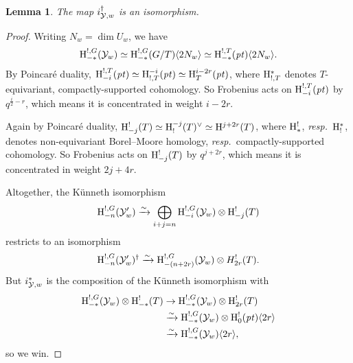 \documentclass[a4paper,10pt,leqno]{amsart}
\theoremstyle{plain}
\theoremstyle{plain}
\theoremstyle{plain}
\newtheorem{lem}[thm]{Lemma}
\theoremstyle{definition}
\theoremstyle{remark}
\newcommand{\point}{\mathit{pt}}
\begin{document}
\begin{lem}
The map $i_{\cal{Y}, w}^\dagger$ is an isomorphism.
\end{lem}

\begin{proof}
Writing $N_w = \dim U_w$, we have
\begin{align}
\ur{H}_{-\ast}^{!, G}(\cal{Y}_w)
\simeq \ur{H}_{-\ast}^{!, G}(G/T)\langle 2N_w\rangle
\simeq \ur{H}_{-\ast}^{!, T}(\point)\langle 2N_w\rangle.
\end{align}
By Poincar\'e duality, $\ur{H}_{-i}^{!, T}(\point) \simeq \ur{H}_{!, T}^{-i}(\point) \simeq \ur{H}_T^{i - 2r}(\point)$, where $\ur{H}_{!, T}^\ast$ denotes $T$-equivariant, compactly-supported cohomology.
So Frobenius acts on $\ur{H}_{-i}^{!, T}(\point)$ by $q^{\frac{i}{2} - r}$, which means it is concentrated in weight $i - 2r$.

Again by Poincar\'e duality, $\ur{H}_{-j}^!(T) \simeq \ur{H}_!^{-j}(T)^\vee \simeq \ur{H}^{j + 2r}(T)$, where $\ur{H}_\ast^!$, \emph{resp.}\ $\ur{H}_!^\ast$, denotes non-equivariant Borel--Moore homology, \emph{resp.}\ compactly-supported cohomology.
So Frobenius acts on $\ur{H}_{-j}^!(T)$ by $q^{j + 2r}$, which means it is concentrated in weight $2j + 4r$.

Altogether, the K\"unneth isomorphism
\begin{align}
\ur{H}_{-n}^{!, G}(\cal{Y}'_w) \xrightarrow{\sim} \bigoplus_{i + j = n} \ur{H}_{-i}^{!, G}(\cal{Y}_w) \otimes \ur{H}_{-j}^!(T)
\end{align}
restricts to an isomorphism 
\begin{align}
\ur{H}_{-n}^{!, G}(\cal{Y}'_w)^\dagger \xrightarrow{\sim} \ur{H}_{-(n + 2r)}^{!, G}(\cal{Y}_w) \otimes H_{2r}^!(T).
\end{align}
But $i_{\cal{Y}, w}^\ast$ is the composition of the K\"unneth isomorphism with
\begin{align}\begin{split}
\ur{H}_{-\ast}^{!, G}(\cal{Y}_w) \otimes \ur{H}_{-\ast}^!(T) 
	&\to \ur{H}_{-\ast}^{!, G}(\cal{Y}_w) \otimes \ur{H}_{2r}^!(T)\\	
	&\xrightarrow{\sim} \ur{H}_{-\ast}^{!, G}(\cal{Y}_w) \otimes \ur{H}_0^!(\point)\langle 2r\rangle\\
	&\xrightarrow{\sim} \ur{H}_{-\ast}^{!, G}(\cal{Y}_w)\langle 2r\rangle,
\end{split}\end{align}
so we win.
\end{proof}
\end{document}
